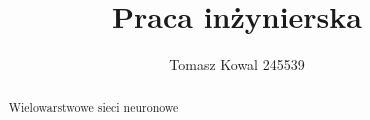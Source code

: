 \documentclass[11pt,a4paper]{article}
\title{Praca inżynierska}
\author{Tomasz Kowal 245539}
\date{}
\begin{document}
	\maketitle

	\begin{abstract}
		Wielowarstwowe sieci neuronowe
	\end{abstract}

	\section{}\label{sec:Wstęp}
	
	\section{}\label{sec:Cel i zakres pisania pracy dyplomowej}

	\section{}\label{sec:Wstęp teoretyczny, przegląd aktualnego stanu wiedzy}

	\section{}\label{sec:Metodyka badawcza i użyte materiały}
	
	\section{}\label{sec:Opis wyników i ich analiza}
	
	\section{}\label{sec:Dyskusja wyników badań}
	
	\section{}\label{sec:Wnioski}
	
	\section{}\label{sec:Bibliografia}
	
\end{document}
